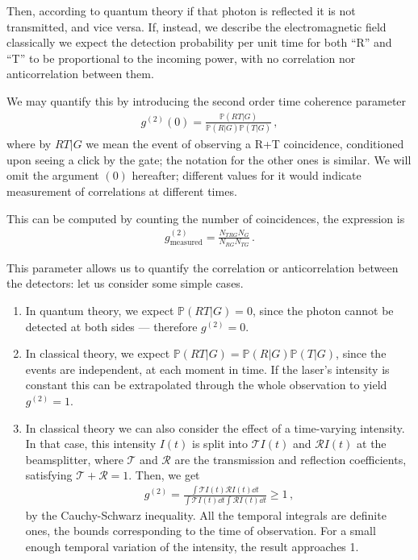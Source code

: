 \documentclass[main.tex]{subfiles}
\begin{document}
Then, according to quantum theory if that photon is reflected it is not transmitted, and vice versa. 
If, instead, we describe the electromagnetic field classically we expect the detection probability per unit time for both ``R'' and ``T'' to be proportional to the incoming power, with no correlation nor anticorrelation between them. 

We may quantify this by introducing the second order time coherence parameter 
%
\begin{align}
g^{(2)} (0) = \frac{ \mathbb{P} (RT | G) }{\mathbb{P}(R|G) \mathbb{P}(T|G)}
\,,
\end{align}
%
where by \(RT | G\) we mean the event of observing a R+T coincidence, conditioned upon seeing a click by the gate; the notation for the other ones is similar. We will omit the argument \((0)\) hereafter; different values for it would indicate measurement of correlations at different times. 

This can be computed by counting the number of coincidences, the expression is 
%
\begin{align}
g^{(2)}_{\text{measured}} = \frac{N_{TRG} N_G}{N_{RG} N_{TG}}
\,.
\end{align}

This parameter allows us to quantify the correlation or anticorrelation between the detectors: let us consider some simple cases. 

\begin{enumerate}
    \item In quantum theory, we expect \(\mathbb{P}(RT|G) = 0\), since the photon cannot be detected at both sides --- therefore \(g^{(2)} = 0\).
    \item In classical theory, we expect \(\mathbb{P}(RT|G) = \mathbb{P}(R|G) \mathbb{P}(T|G)\), since the events are independent, at each moment in time. If the laser's intensity is constant this can be extrapolated through the whole observation to yield \(g^{(2)} = 1\). 
    \item In classical theory we can also consider the effect of a time-varying intensity. In that case, this intensity \(I(t)\) is split into \(\mathcal{T}I(t)\) and \(\mathcal{R}I(t)\) at the beamsplitter, where \(\mathcal{T}\) and \(\mathcal{R}\) are the transmission and reflection coefficients, satisfying \(\mathcal{T} + \mathcal{R} =1\). Then, we get 
    \begin{align}
    g^{(2)} = \frac{ \int \mathcal{T} I(t) \mathcal{R}I(t) \dd{t}}{ \int \mathcal{T} I(t) \dd{t} \int \mathcal{R} I(t) \dd{t}} \geq 1
    \,,
    \end{align}
    by the Cauchy-Schwarz inequality. All the temporal integrals are definite ones, the bounds corresponding to the time of observation. For a small enough temporal variation of the intensity, the result approaches 1. 
\end{enumerate}
\end{document}
